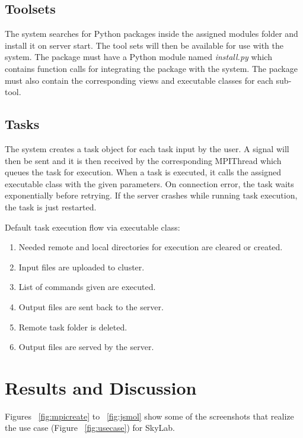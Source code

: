 \subsection{Toolsets} 
The system searches for Python packages inside the assigned modules folder and install it on server start. The tool sets will then be available for use with the system. The package must have a Python module named \emph{install.py} which contains function calls for integrating the package with the system. The package must also contain the corresponding views and executable classes for each sub-tool.  

\subsection{Tasks} 
The system creates a task object for each task input by the user. A signal will then be sent and it is then received by the corresponding MPIThread which queues the task for execution. When a task is executed, it calls the assigned executable class with the given parameters. On connection error, the task waits exponentially before retrying. If the server crashes while running task execution, the task is just restarted.				
		
Default task execution flow via executable class:			
	\begin{enumerate}
		\item  Needed remote and local directories for execution are cleared or created.
		\item  Input files are uploaded to cluster.
		\item  List of commands given are executed.
		\item  Output files are sent back to the server.
		\item  Remote task folder is deleted.
		\item  Output files are served by the server.
	\end{enumerate}	

	
\section{Results and Discussion}
Figures ~\ref{fig:mpicreate} to ~\ref{fig:jsmol} show some of the screenshots that realize the use case (Figure ~\ref{fig:usecase}) for SkyLab.

